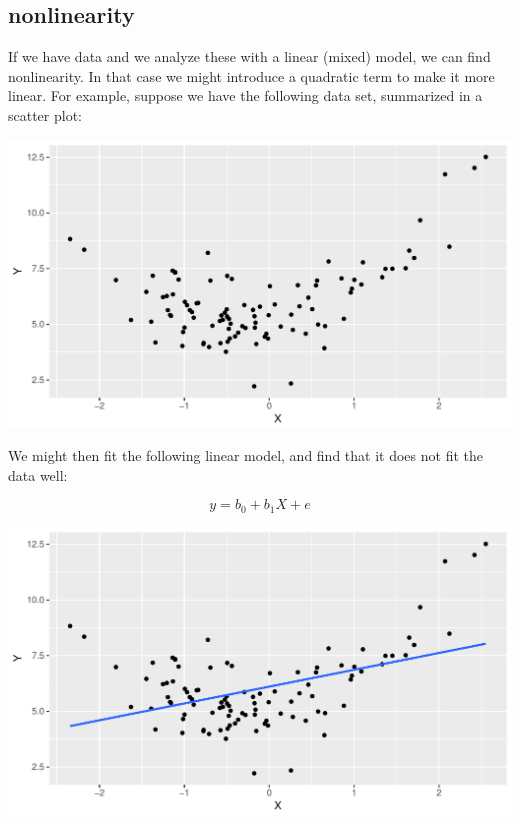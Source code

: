 \documentclass[]{report}\usepackage[]{graphicx}\usepackage[]{color}
\makeatletter
\def\maxwidth{ %
  \ifdim\Gin@nat@width>\linewidth
    \linewidth
  \else
    \Gin@nat@width
  \fi
}
\newenvironment{knitrout}{}{} %
\makeatother
\begin{document}
\subsection{nonlinearity}
If we have data and we analyze these with a linear (mixed) model, we can find nonlinearity. In that case we might introduce a quadratic term to make it more linear. For example, suppose we have the following data set, summarized in a scatter plot:

\begin{knitrout}
\color{fgcolor}

{\centering \includegraphics[width=\maxwidth]{figure/nonpar1-1} 

}



\end{knitrout}


We might then fit the following linear model, and find that it does not fit the data well:

\begin{equation}
y = b_0 + b_1 X + e 
\end{equation}

\begin{knitrout}
\color{fgcolor}

{\centering \includegraphics[width=\maxwidth]{figure/nonpar2-1} 

}



\end{knitrout}
\end{document}
